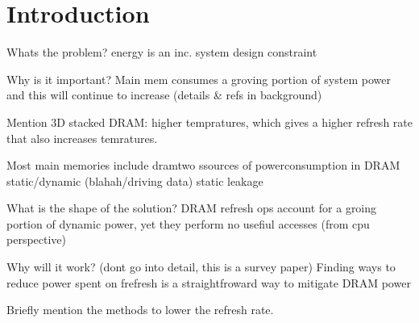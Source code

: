 \section{Introduction}
\label{sec:int}
Whats the problem?
energy is an inc. system design constraint

Why is it important?
Main mem consumes a groving portion of system power and this will continue to increase (details \& refs in background)

Mention 3D stacked DRAM: higher tempratures, which gives a higher refresh rate that also increases temratures.

Most main memories include dramtwo ssources of powerconsumption in DRAM static/dynamic (blahah/driving data)
static leakage

What is the shape of the solution?
DRAM refresh ops account for a groing portion of dynamic power, yet they perform no usefiul accesses (from cpu perspective)

Why will it work? (dont go into detail, this is a survey paper)
Finding ways to reduce power spent on frefresh is a straightfroward way to mitigate DRAM power

Briefly mention the methods to lower the refresh rate.
